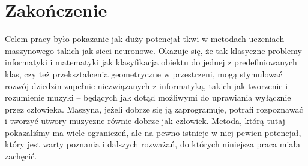 \chapter*{Zakończenie}
\noindent Celem pracy było pokazanie jak duży potencjał tkwi w metodach uczeniach maszynowego takich jak sieci neuronowe. Okazuje się, że tak klasyczne problemy informatyki i matematyki jak klasyfikacja obiektu do jednej z predefiniowanych klas, czy też przekształcenia geometryczne w przestrzeni, mogą stymulować rozwój dziedzin zupełnie niezwiązanych z informatyką, takich jak tworzenie i rozumienie muzyki -- będących jak dotąd możliwymi do uprawiania wyłącznie przez człowieka. Maszyna, jeżeli dobrze się ją zaprogramuje, potrafi rozpoznawać i tworzyć utwory muzyczne równie dobrze jak człowiek. 
Metoda, którą tutaj pokazaliśmy ma wiele ograniczeń, ale na pewno istnieje w niej pewien potencjał, który jest warty poznania i dalszych rozważań, do których niniejsza praca miała zachęcić.